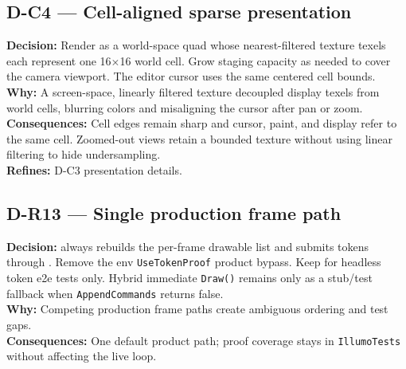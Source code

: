 \subsection*{D-C4 --- Cell-aligned sparse presentation}
\begin{decisionbox}[title={D-C4 \quad 2026-08-07}]
\textbf{Decision:} Render  as a world-space quad whose
nearest-filtered texture texels each represent one 16$\times$16 world cell.
Grow staging capacity as needed to cover the camera viewport. The editor cursor
uses the same centered cell bounds.\\
\textbf{Why:} A screen-space, linearly filtered texture decoupled display
texels from world cells, blurring colors and misaligning the cursor after pan
or zoom.\\
\textbf{Consequences:} Cell edges remain sharp and cursor, paint, and display
refer to the same cell. Zoomed-out views retain a bounded texture without
using linear filtering to hide undersampling.\\
\textbf{Refines:} D-C3 presentation details.
\end{decisionbox}

\subsection*{D-R13 --- Single production frame path}
\begin{decisionbox}[title={D-R13 \quad 2026-08-06}]
\textbf{Decision:}  always rebuilds the per-frame
drawable list and submits tokens through .
Remove the env \texttt{UseTokenProof} product bypass. Keep
 for headless token e2e tests only.
Hybrid immediate \texttt{Draw()} remains only as a stub/test fallback when
\texttt{AppendCommands} returns false.\\
\textbf{Why:} Competing production frame paths create ambiguous ordering and
test gaps.\\
\textbf{Consequences:} One default product path; proof coverage stays in
\texttt{IllumoTests} without affecting the live loop.
\end{decisionbox}

